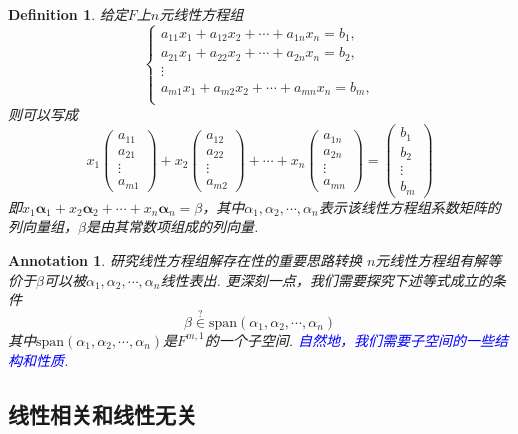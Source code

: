 \documentclass{article}
\newtheorem{definition}[theorem]{Definition}
\newtheorem{annotation}[theorem]{Annotation}
\newcommand{\mbf}[1]{\bm{#1}}
\newcommand{\bluet}[1]{\textcolor{blue}{#1}}
\begin{document}
\begin{definition}
\rm 给定$F$上$n$元线性方程组
$$
\left\{
\begin{array}{c}
a_{11}x_1 + a_{12}x_2 + \cdots + a_{1n}x_n = b_1, \\
a_{21}x_1 + a_{22}x_2 + \cdots + a_{2n}x_n = b_2, \\
\vdots \\
a_{m1}x_1 + a_{m2}x_2 + \cdots + a_{mn}x_n = b_m, \\
\end{array} \right.
$$
则可以写成
$$
x_1 \begin{pmatrix}
a_{11} \\
a_{21} \\
\vdots \\
a_{m1} 
\end{pmatrix} + 
x_2 \begin{pmatrix}
a_{12} \\
a_{22} \\
\vdots \\
a_{m2} 
\end{pmatrix} +
\cdots +
x_n \begin{pmatrix}
a_{1n} \\
a_{2n} \\
\vdots \\
a_{mn}  
\end{pmatrix} = 
\begin{pmatrix}
b_1 \\
b_2 \\
\vdots \\
b_m  
\end{pmatrix} 
$$
即$x_1\mbf{\alpha}_1 + x_2\mbf{\alpha}_2 + \cdots + x_n\mbf{\alpha}_n = \beta $，其中${\alpha}_1,{\alpha}_2,\cdots,{\alpha}_n$表示该线性方程组系数矩阵的列向量组，$\beta$是由其常数项组成的列向量.
\end{definition}

\begin{annotation}
\rm {\color{red} 研究线性方程组解存在性的重要思路转换} $n$元线性方程组有解等价于$\beta$可以被${\alpha}_1,{\alpha}_2,\cdots,{\alpha}_n$线性表出. 更深刻一点，我们需要探究下述等式成立的条件
$$
\beta \overset{?}{\in} \text{span}({\alpha}_1,{\alpha}_2,\cdots,{\alpha}_n) 
$$
其中$\text{span}({\alpha}_1,{\alpha}_2,\cdots,{\alpha}_n)$是$F^{m,1}$的一个子空间. \bluet{自然地，我们需要子空间的一些结构和性质}.
\end{annotation}

\subsection{线性相关和线性无关}
\end{document}
